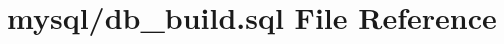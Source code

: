 \hypertarget{db__build_8sql}{\section{mysql/db\-\_\-build.sql File Reference}
\label{db__build_8sql}
}
